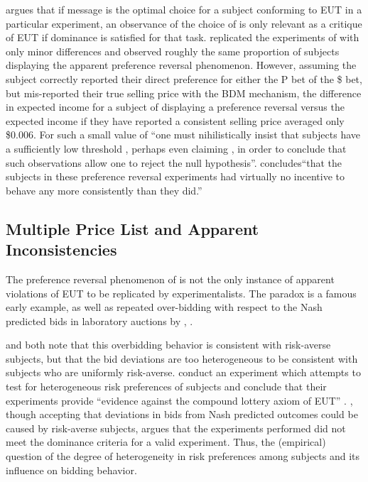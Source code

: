 \textcite{Harrison1989} argues that if message  is the optimal choice for a subject conforming to EUT in a particular experiment, an observance of the choice of  is only relevant as a critique of EUT if dominance is satisfied for that task.
\textcite{Harrison1994} replicated the experiments of\textcite{Grether1979} with only minor differences and observed roughly the same proportion of subjects displaying the apparent preference reversal phenomenon.
However, assuming the subject correctly reported their direct preference for either the P bet of the \$ bet, but mis-reported their true selling price with the BDM mechanism, the difference in expected income for a subject of displaying a preference reversal versus the expected income if they have reported a consistent selling price averaged only \$0.006. 
For such a small value of  \enquote{one must nihilistically insist that subjects have a sufficiently low threshold , perhaps even claiming , in order to conclude that such observations allow one to reject the null hypothesis}\parencite[1428]{Harrison1992}.
\textcite[237]{Harrison1994} concludes\enquote{that the subjects in these preference reversal experiments had virtually no incentive to behave any more consistently than they did.}

\subsection{\texorpdfstring{\textcite{Holt2002}}{Holt \& Laury (2002)} Multiple Price List and Apparent Inconsistencies}

The preference reversal phenomenon of \textcite{Grether1979} is not the only instance of apparent violations of EUT to be replicated by experimentalists.
The \textcite{Ellsberg1961} paradox is a famous early example, as well as repeated over-bidding with respect to the Nash predicted bids in laboratory auctions by \textcite{Cox1982}, \textcite{Cox1983, Cox1983a, Cox1988}.


\textcite[160]{Cox1985} and \textcite[749]{Harrison1989} both note that this overbidding behavior is consistent with risk-averse subjects, but that the bid deviations are too heterogeneous to be consistent with subjects who are uniformly risk-averse.
\textcite{Cox1985} conduct an experiment which attempts to test for heterogeneous risk preferences of subjects and conclude that their experiments provide \enquote{evidence against the compound lottery axiom of EUT} \parencite[165]{Cox1985}.
\textcite{Harrison1989}, though accepting that deviations in bids from Nash predicted outcomes could be caused by risk-averse subjects, argues that the experiments performed did not meet the dominance criteria for a valid experiment.
Thus, the (empirical) question of the degree of heterogeneity in risk preferences among subjects and its influence on bidding behavior.


